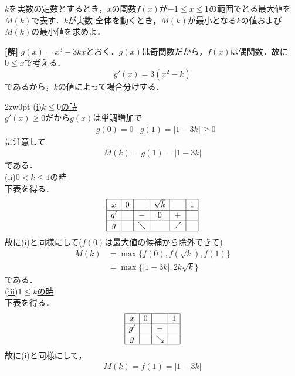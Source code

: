 \documentclass[a4j]{jarticle}
\begin{document}

     \begin{oframed}
     $k$を実数の定数とするとき，$x$の関数$f(x)$が$-1\le x\le1$の範囲でとる最大値を$M(k)$で表す．$k$が実数
     全体を動くとき，$M(k)$が最小となる$k$の値および$M(k)$の最小値を求めよ．
     \end{oframed}

\setlength{\columnseprule}{0.4pt}
\begin{multicols}{2}
{\bf[解]} $g(x)=x^3-3kx$とおく．$g(x)$は奇関数だから，$f(x)$は偶関数．故に$0\le x$で考える．
     \[g'(x)=3(x^2-k)\]
であるから，$k$の値によって場合分けする．\\

     \begin{indentation}{2zw}{0pt}
     \noindent\underline{(i)$k\le0$の時} \\
     $g'(x)\ge0$だから$g(x)$は単調増加で
          \begin{align*}
          &g(0)=0&g(1)=|1-3k|\ge0
          \end{align*}
     に注意して
          \begin{align*}
          M(k)=g(1)=|1-3k|
          \end{align*}
     である．\\
     
     \noindent\underline{(ii)$0<k\le 1$の時}\\
     下表を得る．
          \[
          \begin{array}{|c|c|c|c|c|c|}\hline
          x & 0 &    &\sqrt{k}&     & 1 \\   \hline
          g'&    & -  & 0        & +  &    \\ \hline
          g&    &\searrow&           &\nearrow&    \\ \hline
          \end{array}
          \]
     故に(i)と同様にして($f(0)$は最大値の候補から除外できて)
          \begin{align*}
          M(k)&=\max\{f(0),f(\sqrt{k}),f(1)\} \\
          &=\max\{|1-3k|,2k\sqrt{k}\}
          \end{align*}
     である．\\
     
     \noindent\underline{(iii)$1\le k$の時}\\
     下表を得る．
          \[
          \begin{array}{|c|c|c|c|}\hline
          x & 0 &     & 1 \\ \hline
          g'&    & -   &    \\ \hline
          g&    &\searrow &    \\ \hline
          \end{array}
          \]     
      故に(i)と同様にして，
           \begin{align*}
           M(k)=f(1)=|1-3k|
           \end{align*}
      \end{indentation}
      

\end{multicols}
\end{document}
